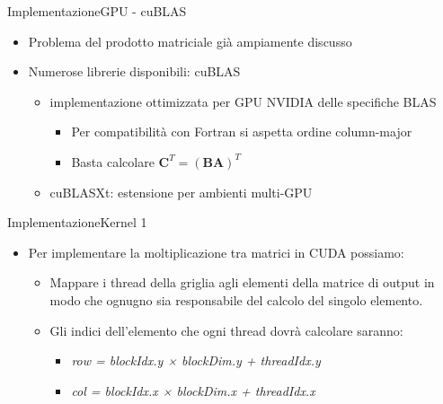 \documentclass{beamer}
\begin{document}
\begin{frame}{Implementazione}{GPU - cuBLAS}
    \begin{itemize}
        \item Problema del prodotto matriciale già ampiamente discusso
        \item Numerose librerie disponibili: \alert{cuBLAS}
              \begin{itemize}
                  \item implementazione ottimizzata per GPU NVIDIA delle specifiche BLAS
                        \begin{itemize}
                            \item Per compatibilità con Fortran si aspetta ordine column-major
                            \item Basta calcolare $\mathbf{C}^T=(\mathbf{B}\mathbf{A})^T$
                        \end{itemize}
                  \item \alert{cuBLASXt}: estensione per ambienti multi-GPU
              \end{itemize}
    \end{itemize}
\end{frame}

\begin{frame}{Implementazione}{Kernel 1}
    \begin{itemize}
        \item Per implementare la moltiplicazione tra matrici in CUDA possiamo:
              \begin{itemize}
                  \item Mappare i thread della griglia agli elementi della matrice di output in modo che ognugno sia responsabile del calcolo del singolo elemento.
                  \item Gli indici dell'elemento che ogni thread dovrà calcolare saranno:
                        \begin{itemize}
                            \item \textit{row = blockIdx.y × blockDim.y + threadIdx.y}
                            \item \textit{col = blockIdx.x × blockDim.x + threadIdx.x}
                        \end{itemize}
              \end{itemize}
    \end{itemize}
\end{frame}
\end{document}
